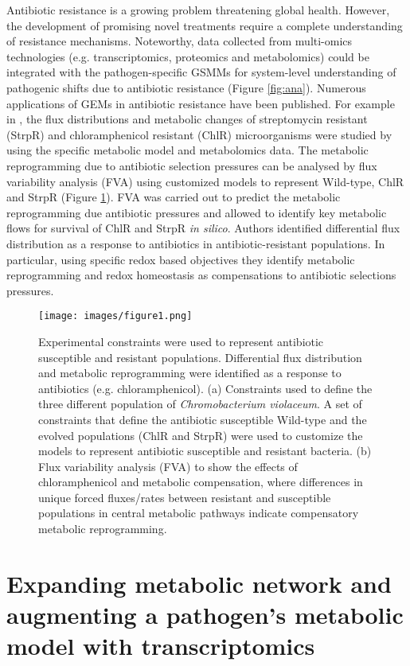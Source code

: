 \documentclass{article}
\begin{document}
Antibiotic resistance is a growing problem threatening global health. However, the development of promising novel treatments require a complete understanding of resistance mechanisms. Noteworthy, data collected from multi-omics technologies (e.g. transcriptomics, proteomics and metabolomics) could be integrated with the pathogen-specific GSMMs for system-level understanding of pathogenic shifts due to antibiotic resistance (Figure \ref{fig:ana}). Numerous applications of GEMs in antibiotic resistance have been published. For example in \cite{Banerjee}, the flux distributions and metabolic changes of streptomycin resistant (StrpR) and chloramphenicol resistant (ChlR) microorganisms were studied by using the specific metabolic model and metabolomics data. The metabolic reprogramming due to antibiotic selection pressures can be analysed by flux variability analysis (FVA) using customized models to represent Wild-type, ChlR and StrpR (Figure \ref{fig:ChlR}). FVA was carried out to predict the metabolic reprogramming due antibiotic pressures and allowed to identify key metabolic flows for survival of ChlR and StrpR {\it in silico}. Authors identified differential flux distribution as a response to antibiotics in antibiotic-resistant populations. In particular, using specific redox based objectives they identify metabolic reprogramming and redox homeostasis as compensations to antibiotic selections pressures.

\begin{figure}
\centering
\texttt{[image: images/figure1.png]}
\caption{\label{fig:ChlR} Experimental constraints were used to represent antibiotic susceptible and resistant populations. Differential flux distribution and metabolic reprogramming were identified as a response to antibiotics (e.g. chloramphenicol). (a) Constraints used to define the three different population of {\it Chromobacterium violaceum}. A set of constraints that define the antibiotic susceptible Wild-type and the evolved populations (ChlR and StrpR) were used to customize the models to represent antibiotic susceptible and resistant bacteria. (b) Flux variability analysis (FVA) to show the effects of chloramphenicol and metabolic compensation, where differences in unique forced fluxes/rates between resistant and susceptible populations in central metabolic pathways indicate compensatory metabolic reprogramming.}
\end{figure}

\section{Expanding metabolic network and augmenting a pathogen’s metabolic model with transcriptomics}
\end{document}
